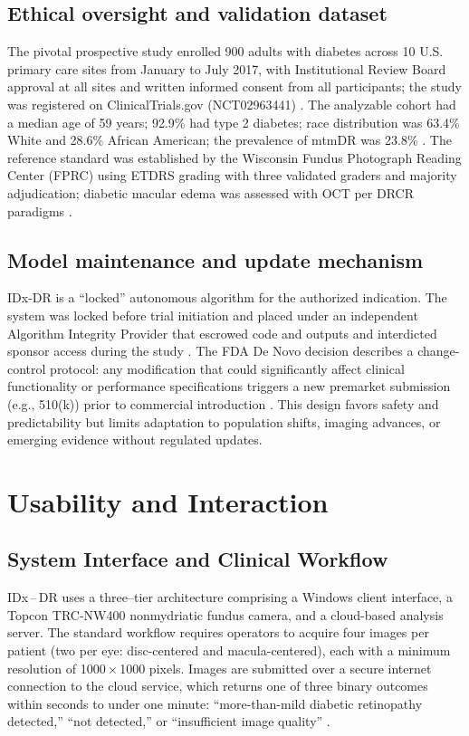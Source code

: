 \documentclass[sigconf]{acmart}
\begin{document}
\subsection{Ethical oversight and validation dataset}
The pivotal prospective study enrolled 900 adults with diabetes across 10 U.S. primary care sites from January to July 2017, with Institutional Review Board approval at all sites and written informed consent from all participants; the study was registered on ClinicalTrials.gov (NCT02963441) \citep{Abramoff2018Pivotal}. The analyzable cohort had a median age of 59 years; 92.9\% had type 2 diabetes; race distribution was 63.4\% White and 28.6\% African American; the prevalence of mtmDR was 23.8\% \citep{Abramoff2018Pivotal}. The reference standard was established by the Wisconsin Fundus Photograph Reading Center (FPRC) using ETDRS grading with three validated graders and majority adjudication; diabetic macular edema was assessed with OCT per DRCR paradigms \citep{FDA2018DEN180001}.

\subsection{Model maintenance and update mechanism}
IDx\mbox{-}DR is a ``locked'' autonomous algorithm for the authorized indication. The system was locked before trial initiation and placed under an independent Algorithm Integrity Provider that escrowed code and outputs and interdicted sponsor access during the study \citep{Abramoff2018Pivotal}. The FDA De Novo decision describes a change\mbox{-}control protocol: any modification that could significantly affect clinical functionality or performance specifications triggers a new premarket submission (e.g., 510(k)) prior to commercial introduction \citep{FDA2018DEN180001}. This design favors safety and predictability but limits adaptation to population shifts, imaging advances, or emerging evidence without regulated updates.

\section{Usability and Interaction}

\subsection{System Interface and Clinical Workflow}

IDx\textsuperscript{\textregistered}\,–\,DR uses a three–tier architecture comprising a Windows client interface, a Topcon TRC\mbox{-}NW400 nonmydriatic fundus camera, and a cloud\mbox{-}based analysis server. The standard workflow requires operators to acquire four images per patient (two per eye: disc\mbox{-}centered and macula\mbox{-}centered), each with a minimum resolution of 1000\,$\times$\,1000 pixels. Images are submitted over a secure internet connection to the cloud service, which returns one of three binary outcomes within seconds to under one minute: “more\mbox{-}than\mbox{-}mild diabetic retinopathy detected,” “not detected,” or “insufficient image quality” \citep{Abramoff2018Pivotal,FDA2018DEN180001}.
\end{document}
